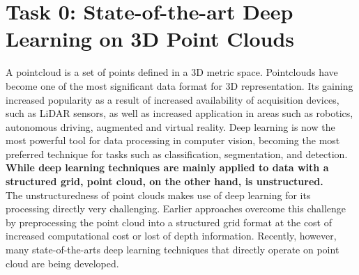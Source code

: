 \documentclass[11pt,a4paper]{article}
\begin{document}
\newpage
\section{Task 0: State-of-the-art Deep Learning on 3D Point Clouds}
A pointcloud is a set of points defined in a 3D metric space. Pointclouds have become one of the most significant data format for 3D representation. Its gaining increased popularity as a result of increased availability of acquisition devices, such as LiDAR sensors, as well as increased application in areas such as robotics, autonomous driving, augmented and virtual reality. Deep learning is now the most powerful tool for data processing in computer vision, becoming the most preferred technique for tasks such as classification, segmentation, and detection. \textbf{While deep learning techniques are mainly applied to data with a structured grid, point cloud, on the other hand, is unstructured.}\\
The unstructuredness of point clouds makes use of deep learning for its processing directly very challenging. Earlier approaches overcome this challenge by preprocessing the point cloud into a structured grid format at the cost of increased computational cost or lost of depth information. Recently, however, many state-of-the-arts deep learning techniques that directly operate on point cloud are being developed.\cite{9127813}
\end{document}
